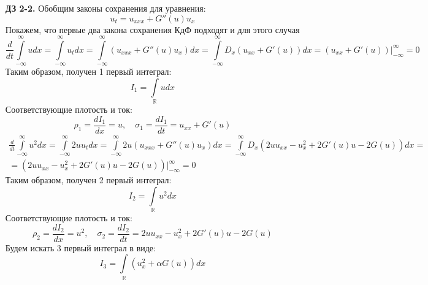 \documentclass[12pt]{article}
\theoremstyle{definition}
\begin{document}
\begin{itemize}
\begin{proof}
\begin{equation}
    \end{equation}
    Значит, $f=f(t,x,u,...,u_{n+k})$ -- противоречие с тем, что $f=f(t,x,u,...,u_n)$ ($k>0$, поскольку при $k=0$ верно, что $n=0$ (следует из (\ref{eq2}))).
    \end{proof}
    \item[\textbf{ДЗ 2-2.}]
    Обобщим законы сохранения для уравнения:
    \begin{equation}
        u_t=u_{xxx}+G''(u)u_x
    \end{equation}
    Покажем, что первые два закона сохранения КдФ подходят и для этого случая
    \begin{equation*}
        \frac{d}{dt}\int\limits_{-\infty}^\infty udx=\int\limits_{-\infty}^\infty u_tdx=\int\limits_{-\infty}^\infty (u_{xxx}+G''(u)u_x)dx=\int\limits_{-\infty}^\infty D_x(u_{xx}+G'(u))dx=(u_{xx}+G'(u))|^\infty_{-\infty}=0
    \end{equation*}
    Таким образом, получен 1 первый интеграл:
    \begin{equation}
        \boxed{I_1=\int\limits_\mathbb{R}udx}
    \end{equation}
    Соответствующие плотость и ток:
    \begin{equation}
        \boxed{\rho_1=\frac{dI_1}{dx}=u, \quad \sigma_1=\frac{dI_1}{dt}=u_{xx}+G'(u)}
    \end{equation}
    \begin{multline*}
        \frac{d}{dt}\int\limits_{-\infty}^\infty u^2dx=\int\limits_{-\infty}^\infty 2uu_tdx=\int\limits_{-\infty}^\infty 2u(u_{xxx}+G''(u)u_x)dx=\int\limits_{-\infty}^\infty D_x(2uu_{xx}-u_x^2+2G'(u)u-2G(u))dx=\\
        =(2uu_{xx}-u_x^2+2G'(u)u-2G(u))|^\infty_{-\infty}=0
    \end{multline*}
    Таким образом, получен 2 первый интеграл:
    \begin{equation}
        \boxed{I_2=\int\limits_\mathbb{R}u^2dx}
    \end{equation}
    Соответствующие плотость и ток:
    \begin{equation}
        \boxed{\rho_2=\frac{dI_2}{dx}=u^2, \quad \sigma_2=\frac{dI_2}{dt}=2uu_{xx}-u_x^2+2G'(u)u-2G(u)}
    \end{equation}
    Будем искать 3 первый интеграл в виде:
    \begin{equation}
        I_3=\int\limits_\mathbb{R}(u_x^2+\alpha G(u))dx
    \end{equation}
    \begin{multline*}

\end{multline*}
\end{itemize}
\end{document}
